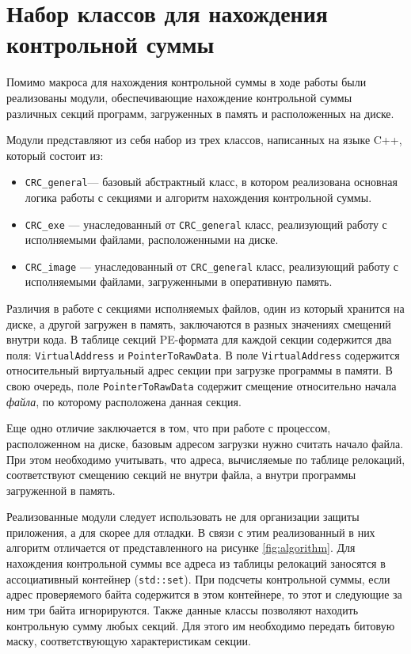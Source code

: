 
\section{Набор классов для нахождения контрольной суммы}

Помимо макроса для нахождения контрольной суммы в ходе работы были реализованы
модули, обеспечивающие нахождение контрольной суммы различных секций программ,
загруженных в память и расположенных на диске.

Модули представляют из себя набор из трех классов, написанных на языке C++,
который состоит из:
\begin{itemize}
  \item \verb!CRC_general!--- базовый абстрактный класс, в котором реализована
    основная логика работы с секциями и алгоритм нахождения контрольной суммы.
  \item \verb!CRC_exe! --- унаследованный от \verb!CRC_general! класс,
    реализующий работу с исполняемыми файлами, расположенными на диске.
  \item \verb!CRC_image! --- унаследованный от \verb!CRC_general! класс,
    реализующий работу с исполняемыми файлами, загруженными в оперативную
    память.
\end{itemize}

Различия в работе с секциями исполняемых файлов, один из который хранится на
диске, а другой загружен в память, заключаются в разных значениях смещений
внутри кода. В таблице секций PE-формата для каждой секции содержится два поля:
\verb!VirtualAddress! и \verb!PointerToRawData!. В поле \verb!VirtualAddress!
содержится относительный виртуальный адрес секции при загрузке программы в
памяти. В свою очередь, поле \verb!PointerToRawData! содержит смещение
относительно начала \textit{файла}, по которому расположена данная секция.

Еще одно отличие заключается в том, что при работе с процессом, расположенном на
диске, базовым адресом загрузки нужно считать начало файла. При этом
необходимо учитывать, что адреса, вычисляемые по таблице релокаций,
соответствуют смещению секций не внутри файла, а внутри программы загруженной в
память.

Реализованные модули следует использовать не для организации защиты приложения,
а для скорее для отладки. В связи с этим реализованный в них алгоритм отличается
от представленного на рисунке \ref{fig:algorithm}. Для нахождения контрольной
суммы все адреса из таблицы релокаций заносятся в ассоциативный контейнер
(\verb!std::set!). При подсчеты контрольной суммы, если адрес проверяемого байта
содержится в этом контейнере, то этот и следующие за ним три байта игнорируются.
Также данные классы позволяют находить контрольную сумму любых секций. Для этого
им необходимо передать битовую маску, соответствующую характеристикам секции.

